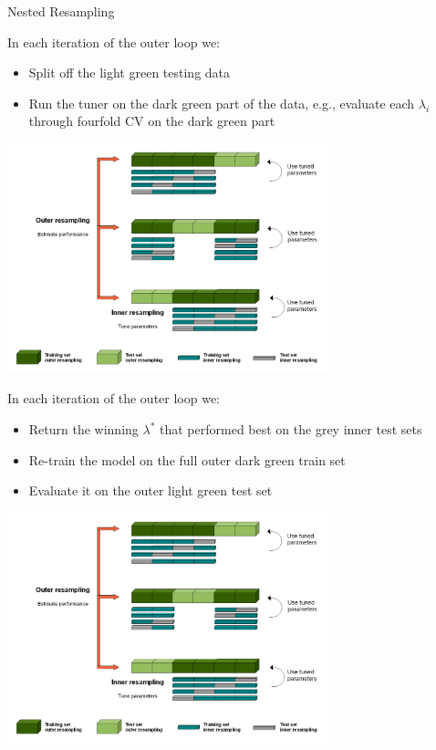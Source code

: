 \documentclass[11pt,compress,t,notes=noshow, xcolor=table]{beamer}
\begin{document}
\begin{vbframe}{Nested Resampling}
\framebreak

\begin{footnotesize}
In each iteration of the outer loop we:
\begin{itemize}
\item Split off the light green testing data
\item Run the tuner on the dark green part of the data, e.g.,
  evaluate each $\lambda_i$ through fourfold CV on the dark green part
\end{itemize}
\end{footnotesize}

\begin{center}\includegraphics[width = 0.7\textwidth]{figure_man/Nested_Resampling.png}\end{center}

\framebreak

\begin{footnotesize}
In each iteration of the outer loop we:
\begin{itemize}
\item Return the winning $\lambda^*$ that performed best on the grey inner test sets
\item Re-train the model on the full outer dark green train set
\item Evaluate it on the outer light green test set
\end{itemize}
\end{footnotesize}

\begin{center}\includegraphics[width = 0.7\textwidth]{figure_man/Nested_Resampling.png}\end{center}


\end{vbframe}
\end{document}
